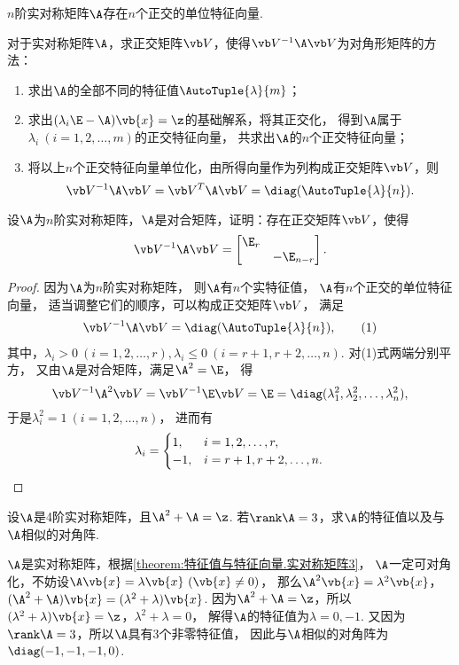 \begin{corollary}
\(n\)阶实对称矩阵\(\A\)存在\(n\)个正交的单位特征向量.
\end{corollary}

\begin{remark}
\color{red}
对于实对称矩阵\(\A\)，求正交矩阵\(\Q\)，使得\(\Q^{-1}\A\Q\)为对角形矩阵的方法：
\begin{enumerate}
	\item 求出\(\A\)的全部不同的特征值\(\AutoTuple{\lambda}{m}\)；
	\item 求出\((\lambda_i\E-\A)\vb{x}=\z\)的基础解系，将其正交化，
	得到\(\A\)属于\(\lambda_i\ (i=1,2,\dotsc,m)\)的正交特征向量，
	共求出\(\A\)的\(n\)个正交特征向量；
	\item 将以上\(n\)个正交特征向量单位化，由所得向量作为列构成正交矩阵\(\Q\)，则\[
		\Q^{-1}\A\Q = \Q^T \A \Q = \diag(\AutoTuple{\lambda}{n}).
	\]
\end{enumerate}
\end{remark}

\begin{example}
设\(\A\)为\(n\)阶实对称矩阵，\(\A\)是对合矩阵，证明：存在正交矩阵\(\Q\)，使得\[
	\Q^{-1}\A\Q=\begin{bmatrix} \E_r \\ & -\E_{n-r} \end{bmatrix}.
\]
\begin{proof}
因为\(\A\)为\(n\)阶实对称矩阵，
则\(\A\)有\(n\)个实特征值，
\(\A\)有\(n\)个正交的单位特征向量，
适当调整它们的顺序，可以构成正交矩阵\(\Q\)，
满足\begin{gather}
	\Q^{-1}\A\Q=\diag(\AutoTuple{\lambda}{n}), \tag1
\end{gather}
其中，\(\lambda_i>0\ (i=1,2,\dotsc,r),
\lambda_i\leq0\ (i=r+1,r+2,\dotsc,n)\).
对(1)式两端分别平方，
又由\(\A\)是对合矩阵，满足\(\A^2=\E\)，
得\[
	\Q^{-1}\A^2\Q
	= \Q^{-1}\E\Q
	= \E
	= \diag(\lambda_1^2,\lambda_2^2,\dotsc,\lambda_n^2),
\]
于是\(\lambda_i^2=1\ (i=1,2,\dotsc,n)\)，
进而有\[
	\lambda_i= \begin{cases}
		1, & i=1,2,\dotsc,r, \\
		-1, & i=r+1,r+2,\dotsc,n.
	\end{cases}
	\qedhere
\]
\end{proof}
\end{example}

\begin{example}
设\(\A\)是4阶实对称矩阵，且\(\A^2+\A=\z\).
若\(\rank\A=3\)，求\(\A\)的特征值以及与\(\A\)相似的对角阵.
\begin{solution}
\(\A\)是实对称矩阵，根据\cref{theorem:特征值与特征向量.实对称矩阵3}，
\(\A\)一定可对角化，不妨设\(\A\vb{x}=\lambda\vb{x}\ (\vb{x}\neq0)\)，
那么\(\A^2\vb{x}=\lambda^2\vb{x}\)，\((\A^2+\A)\vb{x}=(\lambda^2+\lambda)\vb{x}\).
因为\(\A^2+\A=\z\)，所以\((\lambda^2+\lambda)\vb{x}=\z\)，\(\lambda^2+\lambda=0\)，
解得\(\A\)的特征值为\(\lambda=0,-1\).
又因为\(\rank\A=3\)，所以\(\A\)具有3个非零特征值，
因此与\(\A\)相似的对角阵为\(\diag(-1,-1,-1,0)\).
\end{solution}
\end{example}

